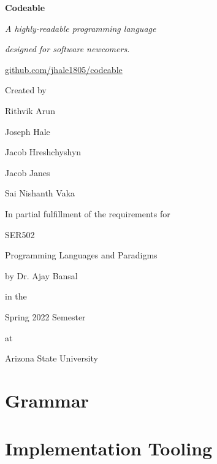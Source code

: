 \documentclass{article}
\begin{document}
    {
        \centering
        
        \textbf{\Huge{Codeable}}
        
        \vspace*{1em}
        \Large{\emph{A highly-readable programming language}}
        
        \Large{\emph{designed for software newcomers.}}
        
        \vspace*{1em}
        \href{https://github.com/jhale1805/codeable}{github.com/jhale1805/codeable}

        \vspace*{5em}
        \Large{Created by}
        
        \vspace*{1em}
        \normalsize{Rithvik Arun}
        
        Joseph Hale 
        
        Jacob Hreshchyshyn 
        
        Jacob Janes 
        
        Sai Nishanth Vaka
        
        \vspace*{5em}
        \Large{In partial fulfillment of the requirements for}
        
        \vspace*{1em}
        \normalsize{SER502}
        
        Programming Languages and Paradigms
        
        by Dr. Ajay Bansal
        
        \vspace*{1em}
        in the 
        
        Spring 2022 Semester
        
        \vspace*{1em}
        at

        Arizona State University

    }
    
    \newpage
    \section{Grammar}
    
    
    \newpage
    \section{Implementation Tooling}
    
\end{document}
